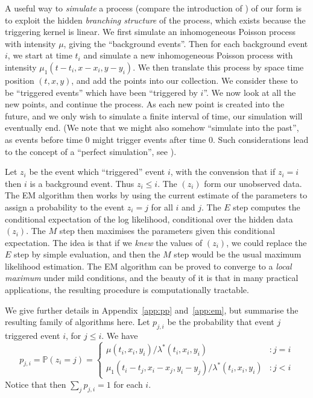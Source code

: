 \documentclass[twoside,a4paper]{article}
\theoremstyle{plain}
\theoremstyle{definition}
\begin{document}
A useful way to \emph{simulate} a process (compare the introduction of \cite{mr, mr1})
of our form is to exploit the hidden
\emph{branching structure} of the process, which exists because the triggering
kernel is linear.  We first simulate an inhomogeneous Poisson process with intensity $\mu$,
giving the ``background events''.  Then for each background event $i$, we start at time $t_i$
and simulate a new inhomogeneous Poisson process with intensity $\mu_1(t-t_i, x-x_i, y-y_i)$.
We then translate this process by space time position $(t,x,y)$, and add the points into our
collection.  We consider these to be ``triggered events'' which have been ``triggered by $i$''.
We now look at all the new points, and continue the process.  As each new point
is created into the future, and we only wish to simulate a finite interval of time, our
simulation will eventually end.  (We note that we might also somehow ``simulate into the past'',
as events before time $0$ might trigger events after time $0$.  Such considerations lead to
the concept of a ``perfect simulation'', see \cite{mr}).

Let $z_i$ be the event which ``triggered'' event $i$, with the convension that if $z_i=i$
then $i$ is a background event.  Thus $z_i \leq i$.  The $(z_i)$ form our unobserved data.
The EM algorithm then works by using the current estimate of the parameters to assign a
probability to the event $z_i=j$ for all $i$ and $j$.  The $E$ step computes the conditional
expectation of the log likelihood, conditional over the hidden data $(z_i)$.  The $M$ step
then maximises the parameters given this conditional expectation.  The idea is that if
we \emph{knew} the values of $(z_i)$, we could replace the $E$ step by simple evaluation,
and then the $M$ step would be the usual maximum likelihood estimation.
The EM algorithm can be proved to converge to a \emph{local maximum} under mild conditions,
and the beauty of it is that in many practical applications, the resulting procedure is
computationally tractable.

We give further details in Appendix~\ref{app:pp} and~\ref{app:em}, but summarise the
resulting family of algorithms here.  Let $p_{j,i}$ be the probability that event $j$
triggered event $i$, for $j\leq i$.  We have
\[
p_{j,i} = \mathbb P(z_i=j) = \begin{cases}
\mu(t_i,x_i,y_i) / \lambda^*(t_i,x_i,y_i) &: j=i \\
\mu_1(t_i-t_j, x_i-x_j, y_i-y_j) / \lambda^*(t_i,x_i,y_i) &: j<i
\end{cases}
\]
Notice that then $\sum_j p_{j,i} = 1$ for each $i$.
\end{document}

